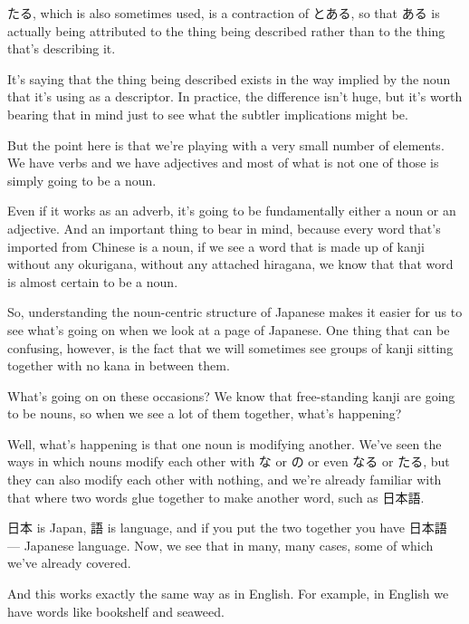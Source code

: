 \stopsectionlevel

\startsectionlevel[title={たる},reference={たる}]

たる, which is also sometimes used, is a contraction of とある, so that ある is actually being attributed to the thing being described rather than to the thing that's describing it.

{}

It's saying that the thing being described exists in the way implied by the noun that it's using as a descriptor. In practice, the difference isn't huge, but it's worth bearing that in mind just to see what the subtler implications might be.

\thinrule

But the point here is that we're playing with a very small number of elements. We have verbs and we have adjectives and most of what is not one of those is simply going to be a noun.

Even if it works as an adverb, it's going to be fundamentally either a noun or an adjective. And an important thing to bear in mind, because every word that's imported from Chinese is a noun, if we see a word that is made up of kanji without any okurigana, without any attached hiragana, we know that that word is almost certain to be a noun.

So, understanding the noun-centric structure of Japanese makes it easier for us to see what's going on when we look at a page of Japanese. One thing that can be confusing, however, is the fact that we will sometimes see groups of kanji sitting together with no kana in between them.

What's going on on these occasions? We know that free-standing kanji are going to be nouns, so when we see a lot of them together, what's happening?

Well, what's happening is that one noun is modifying another. We've seen the ways in which nouns modify each other with な or の or even なる or たる, but they can also modify each other with nothing, and we're already familiar with that where two words glue together to make another word, such as 日本語.

日本 is Japan, 語 is language, and if you put the two together you have 日本語 --- Japanese language. Now, we see that in many, many cases, some of which we've already covered.

And this works exactly the same way as in English. For example, in English we have words like bookshelf and seaweed.

